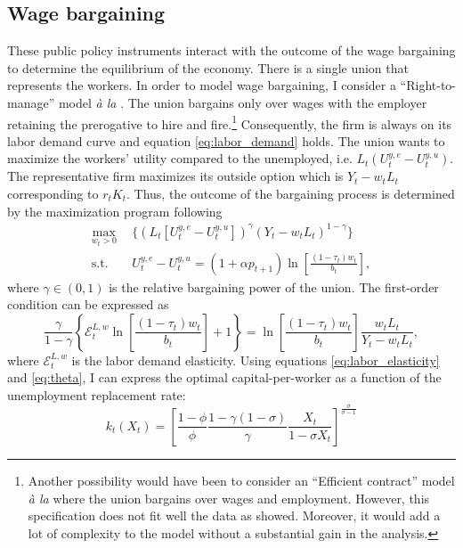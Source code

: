\subsection{Wage bargaining}\label{subsec:wage_bargaining}

These public policy instruments interact with the outcome of the wage bargaining to determine the equilibrium of the economy.
There is a single union that represents the workers. In order to model wage bargaining, I consider a ``Right-to-manage'' model \textit{à la} \cite{Nickell1983}. The union bargains only over wages with the employer retaining the prerogative to hire and fire.\footnote{Another possibility would have been to consider an ``Efficient contract'' model \textit{à la} \cite{McDonald1981} where the union bargains over wages and employment. However, this specification does not fit well the data as \cite{Bentolila2003} showed. Moreover, it would add a lot of complexity to the model without a substantial gain in the analysis.} Consequently, the firm is always on its labor demand curve and equation \eqref{eq:labor_demand} holds. The union wants to maximize the workers' utility compared to the unemployed, i.e. $L_t\left(U^{y,e}_t - U^{y,u}_t\right)$. The representative firm maximizes its outside option which is $Y_t-w_tL_t$ corresponding to $r_t K_t$. Thus, the outcome of the bargaining process is determined by the maximization program following
	\begin{align*}
	\max_{w_t>0} ~~ &\lbrace \left(L_t[U^{y,e}_t - U^{y,u}_t]\right)^\gamma \left(Y_t-w_tL_t\right)^{1-\gamma}\rbrace\\
	\text{s.t.} ~~ &U_t^{y,e} - U_t^{y,u} = (1+\alpha p_{t+1})\ln\left[\frac{(1-\tau_t)w_t}{b_t}\right],
	\end{align*}
where $\gamma\in(0,1)$ is the relative bargaining power of the union. The first-order condition can be expressed as
	\begin{equation*}\label{eq:foc_wage_bargaining}
	\frac{\gamma}{1-\gamma}\left\lbrace\mathcal{E}^{L,w}_t\ln\left[\frac{(1-\tau_t)w_t}{b_t}\right]+1\right\rbrace = \ln\left[\frac{(1-\tau_t)w_t}{b_t}\right] \frac{w_tL_t}{Y_t-w_tL_t},
	\end{equation*}
where $\mathcal{E}^{L,w}_t$ is the labor demand elasticity. Using equations \eqref{eq:labor_elasticity} and \eqref{eq:theta}, I can express the optimal capital-per-worker as a function of the unemployment replacement rate:
	\begin{equation}\label{eq:k(x)}
	k_t(X_t) = \left[\frac{1-\phi}{\phi}\frac{1-\gamma(1-\sigma)}{\gamma}\frac{X_t}{1-\sigma X_t}\right]^{\frac{\sigma}{\sigma-1}}
	\end{equation}
